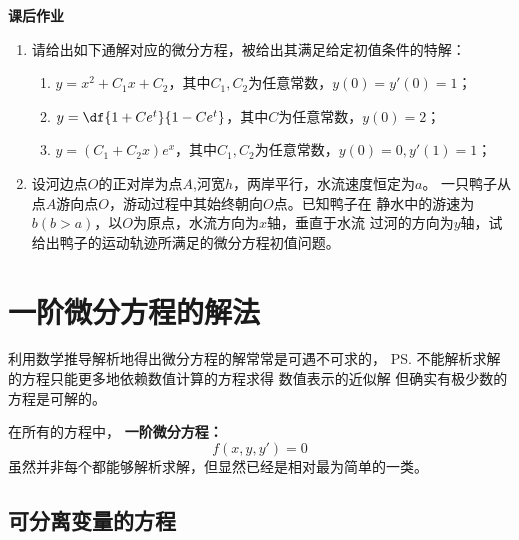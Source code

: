 \begin{ext}
	{\bf 课后作业}
	\begin{enumerate}
	  \item 请给出如下通解对应的微分方程，被给出其满足给定初值条件的特解：
	  \begin{enumerate}[(1)]
	    \item $y=x^2+C_1x+C_2$，其中$C_1,C_2$为任意常数，$y(0)=y'(0)=1$； 
	    \item $y=\df{1+Ce^t}{1-Ce^t}$，其中$C$为任意常数，$y(0)=2$；
	    \item $y=(C_1+C_2x)e^x$，其中$C_1,C_2$为任意常数，$y(0)=0,y'(1)=1$；
	  \end{enumerate}
	  \item 设河边点$O$的正对岸为点$A$,河宽$h$，两岸平行，水流速度恒定为$a$。
	  一只鸭子从点$A$游向点$O$，游动过程中其始终朝向$O$点。已知鸭子在
	  静水中的游速为$b(b>a)$，以$O$为原点，水流方向为$x$轴，垂直于水流
	  过河的方向为$y$轴，试给出鸭子的运动轨迹所满足的微分方程初值问题。
	\end{enumerate}
\end{ext}

\section{一阶微分方程的解法}

利用数学推导解析地得出微分方程的解常常是可遇不可求的，
\ps{不能解析求解的方程只能更多地依赖数值计算的方程求得
数值表示的近似解}
但确实有极少数的方程是可解的。

在所有的方程中， {\bf 一阶微分方程：}
$$f(x,y,y')=0$$
虽然并非每个都能够解析求解，但显然已经是相对最为简单的一类。
 

\subsection{可分离变量的方程}

